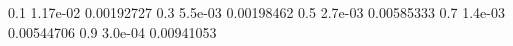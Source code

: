 0.1 1.17e-02 0.00192727
0.3 5.5e-03 0.00198462
0.5 2.7e-03 0.00585333
0.7 1.4e-03 0.00544706
0.9 3.0e-04 0.00941053